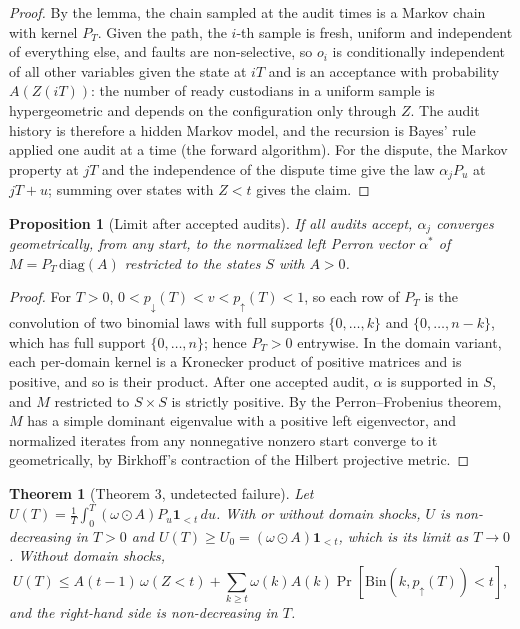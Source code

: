 \documentclass[11pt]{article}
\newtheorem*{theoremS}{Theorem}
\newtheorem*{propositionS}{Proposition}
\begin{document}
\begin{proof}
By the lemma, the chain sampled at the audit times is a Markov chain with kernel $P_T$. Given the path, the $i$-th sample is fresh, uniform and independent of everything else, and faults are non-selective, so $o_i$ is conditionally independent of all other variables given the state at $iT$ and is an acceptance with probability $A(Z(iT))$: the number of ready custodians in a uniform sample is hypergeometric and depends on the configuration only through $Z$. The audit history is therefore a hidden Markov model, and the recursion is Bayes' rule applied one audit at a time (the forward algorithm). For the dispute, the Markov property at $jT$ and the independence of the dispute time give the law $\alpha_jP_u$ at $jT+u$; summing over states with $Z<t$ gives the claim.
\end{proof}

\begin{propositionS}[Limit after accepted audits]
If all audits accept, $\alpha_j$ converges geometrically, from any start, to the normalized left Perron vector $\alpha^{*}$ of $M=P_T\,\mathrm{diag}(A)$ restricted to the states $S$ with $A>0$.
\end{propositionS}

\begin{proof}
For $T>0$, $0<p_{\downarrow}(T)<v<p_{\uparrow}(T)<1$, so each row of $P_T$ is the convolution of two binomial laws with full supports $\{0,\dots,k\}$ and $\{0,\dots,n-k\}$, which has full support $\{0,\dots,n\}$; hence $P_T>0$ entrywise. In the domain variant, each per-domain kernel is a Kronecker product of positive matrices and is positive, and so is their product. After one accepted audit, $\alpha$ is supported in $S$, and $M$ restricted to $S\times S$ is strictly positive. By the Perron--Frobenius theorem, $M$ has a simple dominant eigenvalue with a positive left eigenvector, and normalized iterates from any nonnegative nonzero start converge to it geometrically, by Birkhoff's contraction of the Hilbert projective metric.
\end{proof}

\begin{theoremS}[Theorem 3, undetected failure]
Let $U(T)=\frac1T\int_0^T(\omega\odot A)P_u\mathbf{1}_{<t}\,du$. With or without domain shocks, $U$ is non-decreasing in $T>0$ and $U(T)\ge U_0=(\omega\odot A)\mathbf{1}_{<t}$, which is its limit as $T\to0$. Without domain shocks,
\[
U(T)\le A(t-1)\,\omega(Z<t)+\sum_{k\ge t}\omega(k)A(k)\Pr[\mathrm{Bin}(k,p_{\uparrow}(T))<t],
\]
and the right-hand side is non-decreasing in $T$.
\end{theoremS}
\end{document}
